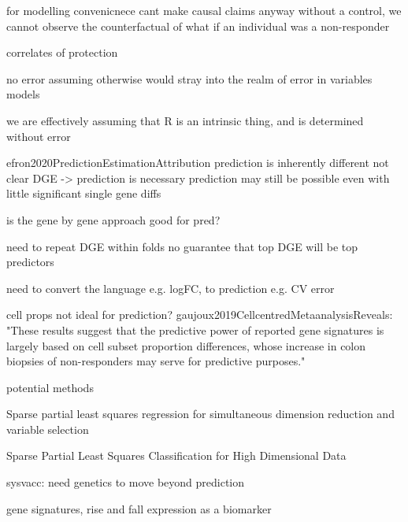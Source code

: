 \begin{outline}
            for modelling convenicnece
            cant make causal claims anyway
                without a control, we cannot observe the counterfactual of what if an individual was a non-responder

            correlates of protection

            no error
                assuming otherwise would stray into the realm of error in variables models
            
                we are effectively assuming that R is an intrinsic thing, and is determined without error
        
        efron2020PredictionEstimationAttribution
        prediction is inherently different
            not clear DGE -> prediction is necessary
            prediction may still be possible even with little significant single gene diffs

            is the gene by gene approach good for pred?
        
        need to repeat DGE within folds
            no guarantee that top DGE will be top predictors

        need to convert the language e.g. logFC, to prediction e.g. CV error

        cell props not ideal for prediction?
            gaujoux2019CellcentredMetaanalysisReveals: "These results suggest that the predictive power of reported gene signatures is largely based on cell subset proportion differences, whose increase in colon biopsies of non-responders may serve for predictive purposes."


        potential methods

            Sparse partial least squares regression for simultaneous dimension reduction and variable selection

             Sparse Partial Least Squares Classification for High Dimensional Data 

        sysvacc: need genetics to move beyond prediction

        gene signatures, rise and fall
            expression as a biomarker


\end{outline}
